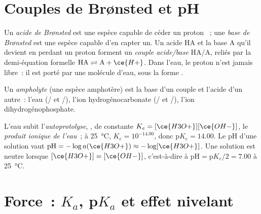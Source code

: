 \section{Couples de Brønsted et pH}

\begin{definition}\label{def:b1:predominant-reaction:bronsted}
Un \emph{acide de Brønsted} est une espèce capable de céder un
proton ~; une \emph{base de Brønsted} est une espèce
capable d'en capter un. Un acide HA et la base A qu'il devient en perdant
un proton forment un \emph{couple acide/base} HA/A,
reliés par la demi-équation formelle $\mathrm{HA} \rightleftharpoons
\mathrm{A} + \ce{H+}$. Dans l'eau, le proton n'est jamais libre~: il est
porté par une molécule d'eau, sous la forme .
\end{definition}

\begin{definition}[Ampholyte]\label{def:b1:predominant-reaction:ampholyte}
Un \emph{ampholyte} (une espèce amphotère) est la base
d'un couple et l'acide d'un autre~: l'eau (/ et
/), l'ion hydrogénocarbonate (/
et /), l'ion dihydrogénophosphate.
\end{definition}

\begin{definition}\label{def:b1:predominant-reaction:autoprotolysis}
L'eau subit l'\emph{autoprotolyse},
, de constante $K_e = [\ce{H3O+}][\ce{OH-}]$, le
\emph{produit ionique de l'eau}~; à
\qty{25}{\celsius}, $K_e = 10^{-14.00}$, donc $\mathrm{p}K_e = 14.00$. Le
pH d'une solution vaut $\mathrm{pH} = -\log a(\ce{H3O+}) \approx -\log[\ce{H3O+}]$.
Une solution est neutre lorsque $[\ce{H3O+}] = [\ce{OH-}]$, c'est-à-dire
à $\mathrm{pH} = \mathrm{p}K_e/2 = 7.00$ à \qty{25}{\celsius}.
\end{definition}

\section{Force~: \texorpdfstring{$K_a$}{Ka}, \texorpdfstring{p$K_a$}{pKa} et effet nivelant}

